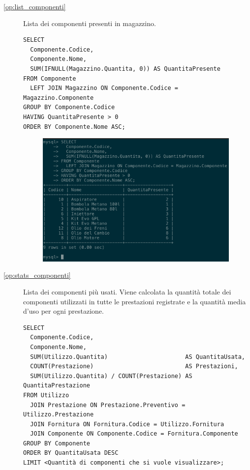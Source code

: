 \begin{description}
            \item[\ref{op:list_componenti}] Lista dei componenti presenti in magazzino.

              \begin{lstlisting}
SELECT
  Componente.Codice,
  Componente.Nome,
  SUM(IFNULL(Magazzino.Quantita, 0)) AS QuantitaPresente
FROM Componente
  LEFT JOIN Magazzino ON Componente.Codice = Magazzino.Componente
GROUP BY Componente.Codice
HAVING QuantitaPresente > 0
ORDER BY Componente.Nome ASC;
              \end{lstlisting}

              \begin{figure}[H]
                \centering
                \includegraphics[width=10cm]{images/screenshots/list_componenti.png}
              \end{figure}

            \item[\ref{op:stats_componenti}] Lista dei componenti più usati. Viene calcolata la quantità totale dei componenti utilizzati in tutte le prestazioni registrate e la quantità media d'uso per ogni prestazione.

              \begin{lstlisting}
SELECT
  Componente.Codice,
  Componente.Nome,
  SUM(Utilizzo.Quantita)                      AS QuantitaUsata,
  COUNT(Prestazione)                          AS Prestazioni,
  SUM(Utilizzo.Quantita) / COUNT(Prestazione) AS QuantitaPrestazione
FROM Utilizzo
  JOIN Prestazione ON Prestazione.Preventivo = Utilizzo.Prestazione
  JOIN Fornitura ON Fornitura.Codice = Utilizzo.Fornitura
  JOIN Componente ON Componente.Codice = Fornitura.Componente
GROUP BY Componente
ORDER BY QuantitaUsata DESC
LIMIT <Quantità di componenti che si vuole visualizzare>;
              \end{lstlisting}


\end{description}
